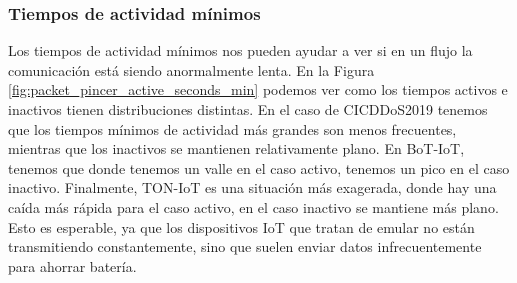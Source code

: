 \subsubsection{Tiempos de actividad mínimos}

Los tiempos de actividad mínimos nos pueden ayudar a ver si en un flujo la comunicación está siendo anormalmente lenta. En la Figura \ref{fig:packet_pincer_active_seconds_min} podemos ver como los tiempos activos e inactivos tienen distribuciones distintas. En el caso de CICDDoS2019 tenemos que los tiempos mínimos de actividad más grandes son menos frecuentes, mientras que los inactivos se mantienen relativamente plano. En BoT-IoT, tenemos que donde tenemos un valle en el caso activo, tenemos un pico en el caso inactivo. Finalmente, TON-IoT es una situación más exagerada, donde hay una caída más rápida para el caso activo, en el caso inactivo se mantiene más plano. Esto es esperable, ya que los dispositivos IoT que tratan de emular no están transmitiendo constantemente, sino que suelen enviar datos infrecuentemente para ahorrar batería.


